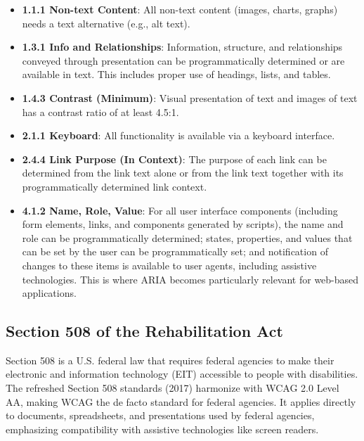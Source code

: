 \begin{itemize}
    \item \textbf{1.1.1 Non-text Content}: All non-text content (images, charts, graphs) needs a text alternative (e.g., alt text).

    \item \textbf{1.3.1 Info and Relationships}: Information, structure, and relationships conveyed through presentation can be programmatically determined or are available in text. This includes proper use of headings, lists, and tables.

    \item \textbf{1.4.3 Contrast (Minimum)}: Visual presentation of text and images of text has a contrast ratio of at least 4.5:1.

    \item \textbf{2.1.1 Keyboard}: All functionality is available via a keyboard interface.

    \item \textbf{2.4.4 Link Purpose (In Context)}: The purpose of each link can be determined from the link text alone or from the link text together with its programmatically determined link context.

    \item \textbf{4.1.2 Name, Role, Value}: For all user interface components (including form elements, links, and components generated by scripts), the name and role can be programmatically determined; states, properties, and values that can be set by the user can be programmatically set; and notification of changes to these items is available to user agents, including assistive technologies. This is where ARIA becomes particularly relevant for web-based applications.

\end{itemize}

\subsection{Section 508 of the Rehabilitation Act}
\label{subsec:section508}
Section 508 \cite{section508gov} is a U.S. federal law that requires federal agencies to make their electronic and information technology (EIT) accessible to people with disabilities. The refreshed Section 508 standards (2017) harmonize with WCAG 2.0 Level AA, making WCAG the de facto standard for federal agencies. It applies directly to documents, spreadsheets, and presentations used by federal agencies, emphasizing compatibility with assistive technologies like screen readers.

